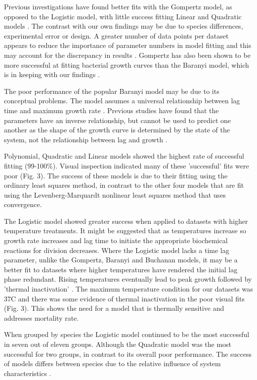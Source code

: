 \documentclass[titlepage]{article}
\begin{document}
  \indent Previous investigations have found better fits with the Gompertz model, as opposed to the Logistic model, with little success fitting Linear and Quadratic models \cite{zwietering1990modeling}. The contrast with our own findings may be due to species differences, experimental error or design. A greater number of data points per dataset appears to reduce the importance of parameter numbers in model fitting and this may account for the discrepancy in results \cite{zwietering1990modeling}. Gompertz has also been shown to be more successful at fitting bacterial growth curves than the Baranyi model, which is in keeping with our findings \cite{buchanan1997simple}. \
  
\indent The poor performance of the popular Baranyi model may be due to its conceptual problems. The model assumes a universal relationship between lag time and maximum growth rate \cite{peleg2011microbial}. Previous studies have found that the parameters have an inverse relationship, but cannot be used to predict one another as the shape of the growth curve is determined by the state of the system, not the relationship between lag and growth \cite{brown2007two}.\ 

\indent Polynomial, Quadratic and Linear models showed the highest rate of successful fitting (99-100\%). Visual inspection indicated many of these 'successful' fits were poor (Fig. 3). The success of these models is due to their fitting using the ordinary least squares method, in contrast to the other four models that are fit using the Levenberg-Marquardt nonlinear least squares method that uses convergence.  \

\indent The Logistic model showed greater success when applied to datasets with higher temperature treatments. It might be suggested that as temperatures increase so growth rate increases and lag time to initiate the appropriate biochemical reactions for division decreases. Where the Logistic model lacks a time lag parameter, unlike the Gompertz, Baranyi and Buchanan models, it may be a better fit to datasets where higher temperatures have rendered the initial lag phase redundant. Rising temperatures eventually lead to peak growth followed by 'thermal inactivation' \cite{peleg2011microbial}. The maximum temperature condition for our datasets was 37\degree C and there was some evidence of thermal inactivation in the poor visual fits (Fig. 3). This shows the need for a model that is thermally sensitive and addresses mortality rate. \

\indent When grouped by species the Logistic model continued to be the most successful in seven out of eleven groups. Although the Quadratic model was the most successful for two groups, in contrast to its overall poor performance. The success of models differs between species due to the relative influence of system characteristics \cite{zwietering1990modeling}. 
\end{document}
